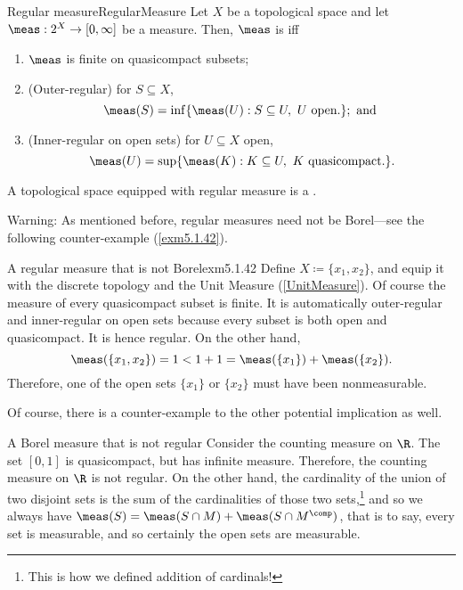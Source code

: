 \begin{dfn}{Regular measure}{RegularMeasure}
Let $X$ be a topological space and let $\meas :2^X\rightarrow [0,\infty ]$ be a measure.  Then, $\meas$ is  iff
\begin{enumerate}
\item $\meas$ is finite on quasicompact subsets;
\item (Outer-regular) for $S\subseteq X$,
\begin{equation}
\meas (S)=\inf \{ \meas (U):S\subseteq U,\ U\text{ open.}\} ;\text{ and }
\end{equation}
\item (Inner-regular on open sets) for $U\subseteq X$ open,
\begin{equation*}
\meas (U)=\sup \{ \meas (K):K\subseteq U,\ K\text{ quasicompact.}\} .
\end{equation*}
\end{enumerate}
A topological space equipped with regular measure is a .
\begin{wrn}
Warning:  As mentioned before, regular measures need not be Borel---see the following counter-example (\cref{exm5.1.42}).
\end{wrn}
\end{dfn}
\begin{exm}{A regular measure that is not Borel}{exm5.1.42}
Define $X\coloneqq \{ x_1,x_2\}$, and equip it with the discrete topology and the Unit Measure (\cref{UnitMeasure}).  Of course the measure of every quasicompact subset is finite.  It is automatically outer-regular and inner-regular on open sets because every subset is both open and quasicompact.  It is hence regular.  On the other hand,
\begin{equation}
\meas (\{ x_1,x_2\} )=1<1+1=\meas (\{ x_1\} )+\meas (\{ x_2\} ).
\end{equation}
Therefore, one of the open sets $\{ x_1\}$ or $\{ x_2\}$ must have been nonmeasurable.
\end{exm}
Of course, there is a counter-example to the other potential implication as well.
\begin{exm}{A Borel measure that is not regular}{}
Consider the counting measure on $\R$.  The set $[0,1]$ is quasicompact, but has infinite measure.  Therefore, the counting measure on $\R$ is not regular.  On the other hand, the cardinality of the union of two disjoint sets is the sum of the cardinalities of those two sets,\footnote{This is how we defined addition of cardinals!} and so we always have $\meas (S)=\meas (S\cap M)+\meas (S\cap M^{\comp})$, that is to say, every set is measurable, and so certainly the open sets are measurable.
\end{exm}

